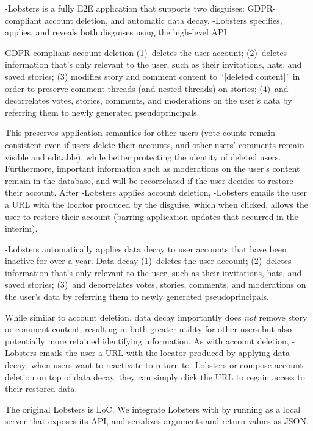 \sys-Lobsters is a fully E2E application that supports two disguises: GDPR-compliant account deletion, and automatic data decay.
\sys-Lobsters specifies, applies, and reveals both disguises using the high-level \sys API.

GDPR-compliant account deletion 
%
(1)~deletes the user account;
%
(2)~deletes information that's only relevant to the user, such as their invitations, hats, and saved
stories;
%
(3) modifies story and comment content to ``[deleted content]'' in order to preserve comment threads
(and nested threads) on stories;
%
(4)~and decorrelates votes, stories, comments, and moderations on the user's data by referring them
to newly generated pseudoprincipals.
%

This preserves application semantics for other users (\eg vote counts remain consistent even if
users delete their accounts, and other users' comments remain visible and editable), while better
protecting the identity of deleted users.  Furthermore, important information such as moderations on
the user's content remain in the database, and will be recorrelated if the user decides to restore
their account.  After \sys-Lobsters applies account deletion, \sys-Lobsters emails the user a URL with the
locator produced by the disguise, which when clicked, allows the user to restore their account
(barring application updates that occurred in the interim).

\sys-Lobsters automatically applies data decay to user accounts that have been inactive for over a year.
Data decay 
%
(1)~deletes the user account;
%
(2)~deletes information that's only relevant to the user, such as their invitations, hats, and saved
stories;
%
(3)~and decorrelates votes, stories, comments, and moderations on the user's data by referring them
to newly generated pseudoprincipals.
%

While similar to account deletion, data decay importantly does \emph{not} remove story or comment
content, resulting in both greater utility for other users but also potentially more retained
identifying information.  As with account deletion, \sys-Lobsters emails the user a URL with the locator
produced by applying data decay; when users want to reactivate to return to \sys-Lobsters or compose
account deletion on top of data decay, they can simply click the URL to regain access to their
restored data.

The original Lobsters is LoC. We integrate Lobsters with \sys by running \sys as a local
server that exposes its API, and serializes arguments and return values as JSON.

